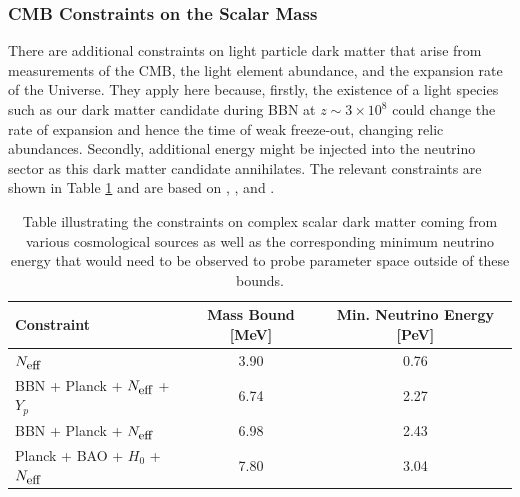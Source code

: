 \documentclass[11pt]{article}
\numberwithin{equation}{section}
\numberwithin{figure}{section}
\numberwithin{table}{section}
\begin{document}
\subsubsection{CMB Constraints on the Scalar Mass}\label{sec:cmbconstraints}

There are additional constraints on light particle dark matter that arise from measurements of the CMB, the light element abundance, and the expansion rate of the Universe. They apply here because, firstly, the existence of a light species such as our dark matter candidate during BBN at $z \sim 3 \times 10^8$ could change the rate of expansion and hence the time of weak freeze-out, changing relic abundances. Secondly, additional energy might be injected into the neutrino sector as this dark matter candidate annihilates. The relevant constraints are shown in Table \ref{tab:cmb} and are based on \cite{Boehm}, \cite{Nollett2015}, and \cite{Escudero2019}.

\begin{table}[b]
\centering
\begin{tabular}{lcc}
\toprule \textbf{Constraint} & \textbf{Mass Bound [MeV]} & \textbf{Min. Neutrino Energy [PeV]} \\
\midrule 
$N_{\textrm{\small eff}}$ \cite{Boehm} & 3.90 & 0.76 \\
BBN + Planck + $N_{\textrm{\small eff}}$ + $Y_p$ \cite{Nollett2015} & 6.74 & 2.27 \\
BBN + Planck + $N_{\textrm{\small eff}}$ \cite{Nollett2015} & 6.98 & 2.43 \\
Planck + BAO + $H_0$ + $N_{\textrm{\small eff}}$ \cite{Escudero2019} & 7.80 & 3.04 \\
\bottomrule
\end{tabular}
\caption{Table illustrating the constraints on complex scalar dark matter coming from various cosmological sources as well as the corresponding minimum neutrino energy that would need to be observed to probe parameter space outside of these bounds.}
\label{tab:cmb}
\end{table}
\end{document}
